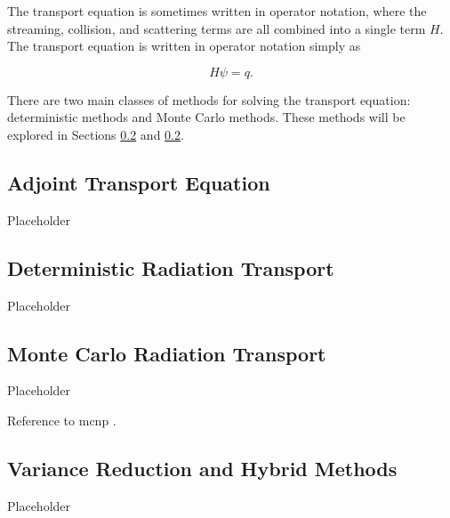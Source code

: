 The transport equation is sometimes written in operator notation, where the streaming, collision, and scattering terms are all combined into a single term $H$.
The transport equation is written in operator notation simply as

\begin{equation}
  H\psi = q.
\end{equation}

There are two main classes of methods for solving the transport equation: deterministic methods and Monte Carlo methods.
These methods will be explored in Sections \ref{sec:bg:rt:determ} and \ref{sec:bg:rt:determ}.

\subsection{Adjoint Transport Equation}
\label{sec:bg:rt:determ}

Placeholder

\subsection{Deterministic Radiation Transport}
\label{sec:bg:rt:determ}

Placeholder

\subsection{Monte Carlo Radiation Transport}
\label{sec:bg:rt:mc}

Placeholder

Reference to \ac{mcnp} \cite{mcnp5-theory}.

\subsection{Variance Reduction and Hybrid Methods}
\label{sec:bg:rt:vr}

Placeholder
